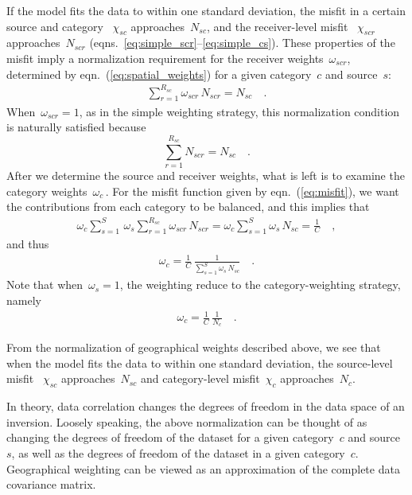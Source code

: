 If the model fits the data to 
within one standard deviation, the misfit in a certain source and category ~$\chi_{sc}$ approaches~$N_{sc}$, and the receiver-level misfit ~$\chi_{scr}$ approaches~$N_{scr}$ 
(eqns.~\ref{eq:simple_scr}--\ref{eq:simple_cs}).
These properties of the misfit imply a normalization requirement for the receiver weights~$\omega_{scr}$, 
determined by eqn.~(\ref{eq:spatial_weights}) for a given category~$c$ and source~$s$:
\begin{align}
\label{eq:recnorm}
\sum_{r=1}^{R_{sc}} \omega_{scr} \, N_{scr} = N_{sc}
\quad .
\end{align}
When~$\omega_{scr} = 1$, as in the simple weighting strategy, this normalization 
condition is naturally satisfied because
\begin{equation}
\sum_{r=1}^{R_{sc}} N_{scr} = N_{sc}
\quad .
\end{equation}
After we determine the source and receiver weights, what is left is to examine the category weights~$\omega_c$\,.
For the misfit function given by eqn.~(\ref{eq:misfit}), we want the contributions from each category to be balanced, 
and this implies that
\begin{align}
\omega_{c} \sum_{s=1}^{S}\, \omega_s \sum_{r=1}^{R_{sc}} \omega_{scr}\,N_{scr}
=
\omega_{c} \sum_{s=1}^{S} \omega_s\, N_{sc}
= \frac{1}{C} 
\quad ,
\end{align}
and thus
\begin{align}
\omega_{c} = \frac{1}{C}\,\frac{1}{ \sum_{s=1}^{S} \omega_s\, N_{sc}}
\quad .
\end{align}
Note that when~$\omega_s=1$, the weighting reduce to the category-weighting strategy, namely
\begin{align}
\omega_{c} = \frac{1}{C}\,\frac{1}{ N_{c}}
\quad .
\end{align}

From the normalization of geographical weights described above, we see that when the model 
fits the data to within one standard deviation, the source-level misfit ~$\chi_{sc}$ approaches~$N_{sc}$
and category-level misfit~$\chi_{c}$ approaches~$N_{c}$.

In theory, data correlation changes the degrees of freedom in the data space 
of an inversion.
Loosely speaking,
the above normalization can be thought of as changing  the degrees of freedom of the dataset for a given category~$c$ and source~$s$, as well as the degrees of freedom of the dataset in a given category~$c$.
Geographical weighting can be viewed as an approximation of the complete 
data covariance matrix. 
%
%

